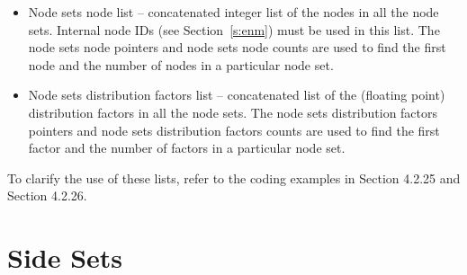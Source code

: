 \begin{itemize}
 \item Node sets node list -- concatenated integer list of the nodes
 in all the node sets. Internal node IDs (see Section~\ref{s:enm})
 must be used in this list. The node sets node pointers and node sets
 node counts are used to find the first node and the number of nodes
 in a particular node set.

 \item Node sets distribution factors list -- concatenated 
list of the (floating point) distribution factors in all the 
node sets. The node sets distribution factors pointers and node 
sets distribution factors counts are used to find the first factor 
and the number of factors in a particular node set.

\end{itemize}

To clarify the use of these lists, refer to the coding examples 
in  Section 4.2.25 and  Section 4.2.26.

\section{Side Sets}

